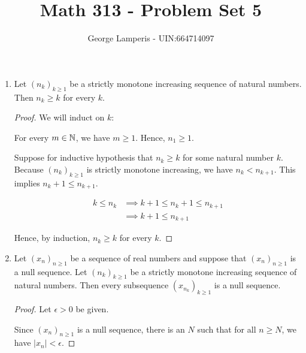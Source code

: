 \documentclass[12pt, letterpaper]{article}
\begin{document}
\title{Math 313 - Problem Set 5\vspace{-2ex}}%
\author{George Lamperis - UIN:664714097} %
\date{\vspace{-2ex}}
\maketitle


\begin{enumerate}[label=\bfseries1\alph*)]

\item Let $(n_k)_{k \geq 1}$ be a strictly monotone increasing sequence of 
natural numbers. Then $n_k \geq k$ for every $k$.
\begin{proof} 
	We will induct on $k$:

	For every $m \in \mathbb{N}$, we have $m \geq 1$. Hence, $n_1 \geq 1$.

	Suppose for inductive hypothesis that $n_k \geq k$ for some natural 
	number $k$. Because $(n_k)_{k \geq 1}$ is strictly monotone increasing, 
	we have $n_k < n_{k+1}$. This implies $n_k + 1 \leq n_{k+1}$.

	\begin{align*}
		k \leq n_k 	&\implies k+1 \leq n_k + 1 \leq n_{k+1} \\
					&\implies k+1 \leq n_{k+1}
	\end{align*}

	Hence, by induction, $n_k \geq k$ for every $k$.
\end{proof}

\item Let $(x_n)_{n \geq 1}$ be a sequence of real numbers and suppose that 
$(x_n)_{n \geq 1}$ is a null sequence. Let $(n_k)_{k \geq 1}$ be a strictly 
monotone increasing sequence of natural numbers. Then every subsequence 
$(x_{n_k})_{k \geq 1}$ is a null sequence.

\begin{proof}
	Let $\epsilon > 0$ be given. 

	Since $(x_n)_{n \geq 1}$ is a null sequence, there is an $N$ such that for all
	$n \geq N$, we have $|x_n| < \epsilon$. 


\end{proof}
\end{enumerate}
\end{document}

